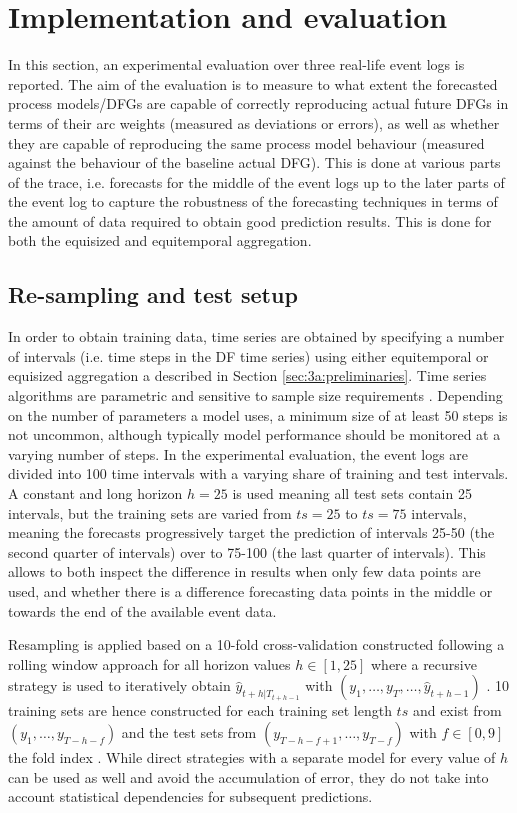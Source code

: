 \section{Implementation and evaluation}\label{sec:experiment}
In this section, an experimental evaluation over three real-life event logs is reported.
The aim of the evaluation is to measure to what extent the forecasted process models/DFGs are capable of correctly reproducing actual future DFGs in terms of their arc weights (measured as deviations or errors), as well as whether they are capable of reproducing the same process model behaviour (measured against the behaviour of the baseline actual DFG).
This is done at various parts of the trace, i.e. forecasts for the middle of the event logs up to the later parts of the event log to capture the robustness of the forecasting techniques in terms of the amount of data required to obtain good prediction results.
This is done for both the equisized and equitemporal aggregation.

\subsection{Re-sampling and test setup}
In order to obtain training data, time series are obtained by specifying a number of intervals (i.e. time steps in the DF time series) using either equitemporal or equisized aggregation a described in Section \ref{sec:3a:preliminaries}.
Time series algorithms are parametric and sensitive to sample size requirements \cite{hanke2001business}.
Depending on the number of parameters a model uses, a minimum size of at least 50 steps is not uncommon, although typically model performance should be monitored at a varying number of steps.
In the experimental evaluation, the event logs are divided into 100 time intervals with a varying share of training and test intervals. A constant and long horizon $h=25$ is used meaning all test sets contain 25 intervals, but the training sets are varied from $ts=25$ to $ts=75$ intervals, meaning the forecasts progressively target the prediction of intervals 25-50 (the second quarter of intervals) over to 75-100 (the last quarter of intervals).
This allows to both inspect the difference in results when only few data points are used, and whether there is a difference forecasting data points in the middle or towards the end of the available event data.

Resampling is applied based on a 10-fold cross-validation constructed following a rolling window approach for all horizon values $h\in[1,25]$ where a recursive strategy is used to iteratively obtain $\hat{y}_{t+h|T_{t+h-1}}$ with $(y_1,\dots,y_{T},\dots,\hat{y}_{t+h-1})$ \cite{weigend2018time}.
10 training sets are hence constructed for each training set length $ts$ and exist from $(y_1,\dots,y_{T-h-f})$ and the test sets from $(y_{T-h-f+1},\dots,y_{T-f})$ with $f\in[0,9]$ the fold index \cite{bergmeir2012use}.
While direct strategies with a separate model for every value of $h$ can be used as well and avoid the accumulation of error, they do not take into account statistical dependencies for subsequent predictions.


